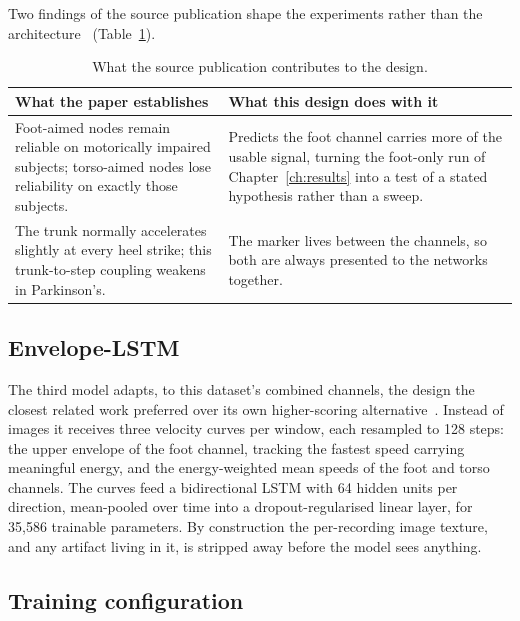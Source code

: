 Two findings of the source publication shape the experiments rather than the
architecture~\cite{lopezdelgado2026} (Table~\ref{tab:papercontrib}).

\begin{table}[H]
  \centering
  \caption[What the source publication contributes to the design]{What the source publication contributes to the design.}
  \label{tab:papercontrib}
  \small
  \begin{tabular}{@{}p{5.6cm}p{6.6cm}@{}}
    \toprule
    What the paper establishes & What this design does with it \\
    \midrule
    Foot-aimed nodes remain reliable on motorically impaired subjects;
    torso-aimed nodes lose reliability on exactly those subjects. &
      Predicts the foot channel carries more of the usable signal, turning
      the foot-only run of Chapter~\ref{ch:results} into a test of a stated hypothesis
      rather than a sweep. \\
    \addlinespace
    The trunk normally accelerates slightly at every heel strike; this
    trunk-to-step coupling weakens in Parkinson's. &
      The marker lives between the channels, so both are always presented to
      the networks together. \\
    \bottomrule
  \end{tabular}
\end{table}

\subsection{Envelope-LSTM}

The third model adapts, to this dataset's combined channels, the design the
closest related work preferred over its own higher-scoring
alternative~\cite{hayashi2021}. Instead of images it
receives three velocity curves per window, each resampled to 128 steps: the
upper envelope of the foot channel, tracking the fastest speed carrying
meaningful energy, and the energy-weighted mean speeds of the foot and torso
channels. The curves feed a bidirectional LSTM with 64 hidden units per
direction, mean-pooled over time into a dropout-regularised linear layer, for
35{,}586 trainable parameters. By construction the per-recording image
texture, and any artifact living in it, is stripped away before the model
sees anything.

\subsection{Training configuration}

